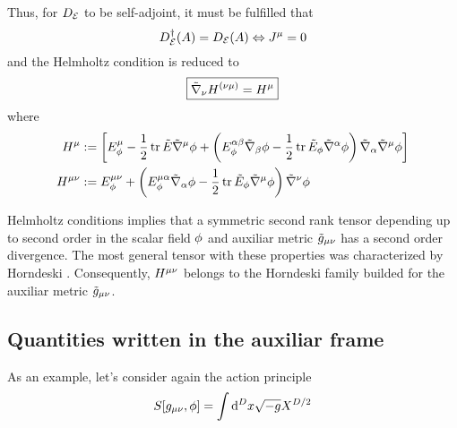 Thus, for $D_{\mathcal{E}} $ to be self-adjoint, it must be fulfilled that
\begin{equation}
  D^\dagger _{\mathcal{E}} (A)=D_{\mathcal{E}} (A) \Leftrightarrow J^\mu =0
\end{equation}
and the Helmholtz condition is reduced to
\begin{equation}\label{Hemholtz-condition}
\boxed{  \tilde{\nabla}_\nu H^{(\nu\mu) }=H^\mu }
\end{equation}
where 
\begin{align}
  H^\mu &:=\left[E^\mu_\phi -\frac{1}{2}\tr\tilde{E}\tilde{\nabla}^\mu\phi +\left(E^{\alpha\beta }_\phi\tilde{\nabla}_\beta \phi -\frac{1}{2}\tr \tilde{E}_\phi\tilde{\nabla}^\alpha\phi \right)\tilde{\nabla}_\alpha\tilde{\nabla}^\mu\phi \right]\\
  H^{\mu\nu }&:=E^{\mu\nu }_\phi+\left(E^{\mu\alpha }_\phi \tilde{\nabla}_\alpha \phi-\frac{1}{2}\tr\tilde{E}_\phi\tilde{\nabla}^\mu\phi \right)\tilde{\nabla}^\nu\phi 
\end{align}

Helmholtz conditions implies that a symmetric second rank tensor depending up to second order in the scalar field $\phi$ and auxiliar metric $\tilde{g}_{\mu\nu }$ has a second order divergence. The most general tensor with these properties was characterized by Horndeski \cite{Horndeski:1974wa}. Consequently, $H^{\mu\nu }$ belongs to the Horndeski family builded for the auxiliar metric $\tilde{g}_{\mu\nu }$.

\subsection{Quantities written in the auxiliar frame}
As an example, let's consider again the action principle
\begin{equation}\label{S-auxiliar-frame}
  S[g_{\mu\nu },\phi ]=\int\dd^Dx\sqrt{-g}X^{D/2}
\end{equation}

